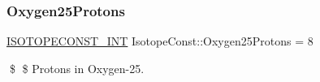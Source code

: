 \subsubsection{\texorpdfstring{Oxygen25\+Protons}{Oxygen25Protons}}
{\footnotesize\ttfamily \mbox{\hyperlink{group___isotope_const-_macros_ga5f18360b3e99483a35c32d789e62621c}{I\+S\+O\+T\+O\+P\+E\+C\+O\+N\+S\+T\+\_\+\+I\+NT}} Isotope\+Const\+::\+Oxygen25\+Protons = 8}

\$ \$ Protons in Oxygen-\/25. 
